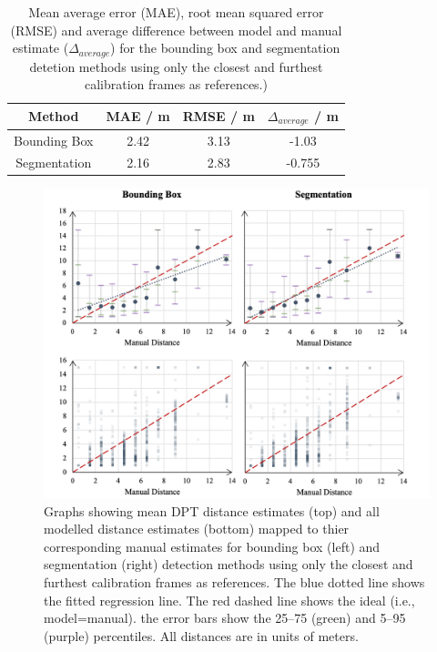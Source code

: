 \vspace{5mm}

\begin{table}[htbp]
    \centering
    \caption{Mean average error (MAE), root mean squared error (RMSE) and average difference between
    model and manual estimate ($\Delta_{average}$) for the bounding box and segmentation detetion methods
    using only the closest and furthest calibration frames as references.)}
    \label{tab:reduced_calibration_errors}
    \begin{tabular}{cccc}
        \textbf{Method} & \textbf{MAE / m} & \textbf{RMSE / m} & \textbf{$\Delta_{average}$ / m} \\
        \midrule
        Bounding Box  & 2.42 & 3.13 & -1.03  \\
        Segmentation  & 2.16 & 2.83 & -0.755 \\
    \end{tabular}
\end{table}

\vspace{5mm}

\begin{figure}[H]
    \centering
    \includegraphics[width=1\textwidth]{body/analysis/assets/distance_graphs/reduced_cal}
    \caption{Graphs showing mean DPT distance estimates (top) and all modelled distance
        estimates (bottom) mapped to thier corresponding manual
        estimates for bounding box (left) and segmentation (right) detection methods using only the
        closest and furthest calibration frames as references. The blue dotted line
        shows the fitted regression line. The red dashed line shows the ideal (i.e., model=manual).
        the error bars show the 25–75 (green) and 5–95 (purple) percentiles. All distances are in
        units of meters.}
    \label{fig:reduced_calibration}
\end{figure}

